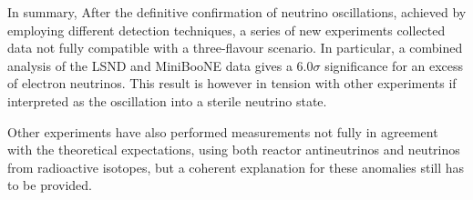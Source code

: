 \vspace{1em}

In summary, After the definitive confirmation of neutrino oscillations, achieved by employing different detection techniques, a series of new experiments collected data not fully compatible with a three-flavour scenario. In particular, a combined analysis of the LSND and MiniBooNE data gives a $6.0\sigma$ significance for an excess of electron neutrinos. This result is however in tension with other experiments if interpreted as the oscillation into a sterile neutrino state. 

Other experiments have also performed measurements not fully in agreement with the theoretical expectations, using both reactor antineutrinos and neutrinos from radioactive isotopes, but a coherent explanation for these anomalies still has to be provided. 